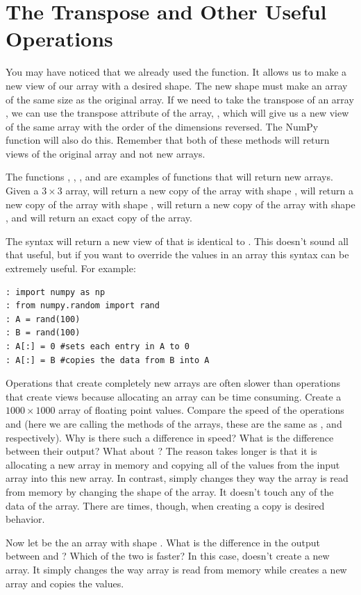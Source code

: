 \section*{The Transpose and Other Useful Operations}
You may have noticed that we already used the  function.
It allows us to make a new view of our array with a desired shape.
The new shape must make an array of the same size as the original array.
If we need to take the transpose of an array , we can use the transpose attribute of the array, , which will give us a new view of the same array with the order of the dimensions reversed.
The NumPy  function will also do this.
Remember that both of these methods will return views of the original array and not new arrays.

The functions , , , and  are examples of functions that will return new arrays.
Given a $3 \times 3$ array,  will return a new copy of the array with shape ,  will return a new copy of the array with shape ,  will return a new copy of the array  with shape , and  will return an exact copy of the array.

The syntax  will return a new view of  that is identical to .
This doesn't sound all that useful, but if you want to override the values in an array this syntax can be extremely useful.
For example:
\begin{lstlisting}
: import numpy as np
: from numpy.random import rand
: A = rand(100)
: B = rand(100)
: A[:] = 0 #sets each entry in A to 0
: A[:] = B #copies the data from B into A
\end{lstlisting}

\begin{problem}
Operations that create completely new arrays are often slower than operations that create views because allocating an array can be time consuming.
Create a $1000 \times 1000$ array  of floating point values.
Compare the speed of the operations  and  (here we are calling the methods of the arrays, these are the same as , and  respectively).
Why is there such a difference in speed?
What is the difference between their output?
What about ?
The reason  takes longer is that it is allocating a new array in memory and copying all of the values from the input array into this new array.  In contrast,  simply changes they way the array is read from memory by changing the shape of the array.  It doesn't touch any of the data of the array.  There are times, though, when creating a copy is desired behavior.

Now let  be the an array with shape .
What is the difference in the output between  and ?
Which of the two is faster?
In this case,  doesn't create a new array.  It simply changes the way array is read from memory while  creates a new array and copies the values.
\end{problem}

